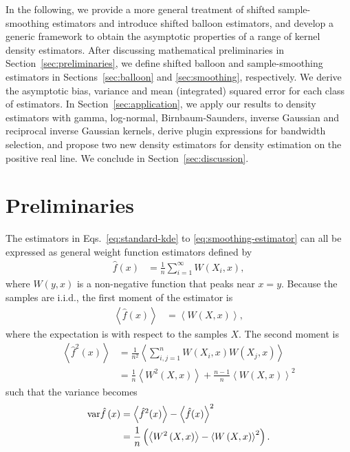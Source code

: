 In the following, we provide a more general treatment of shifted sample-smoothing estimators and introduce shifted balloon estimators, and develop a generic framework to obtain the asymptotic properties of a range of kernel density estimators. After discussing mathematical preliminaries in Section~\ref{sec:preliminaries}, we define shifted balloon and sample-smoothing estimators in Sections~\ref{sec:balloon} and \ref{sec:smoothing}, respectively. We derive the asymptotic bias, variance and mean (integrated) squared error for each class of estimators. In Section~\ref{sec:application}, we apply our results to density estimators with gamma, log-normal, Birnbaum-Saunders, inverse Gaussian and reciprocal inverse Gaussian kernels, derive plugin expressions for bandwidth selection, and propose two new density estimators for density estimation on the positive real line. We conclude in Section~\ref{sec:discussion}.


\section{Preliminaries\label{sec:preliminaries}}

The estimators in Eqs.~\eqref{eq:standard-kde} to \eqref{eq:smoothing-estimator} can all be expressed as general weight function estimators defined by
\begin{align}
\hat{f}\left(x\right) & =\frac{1}{n}\sum_{i=1}^{\infty}W\left(X_{i},x\right),\label{eq:generalised-estimator}
\end{align}
where $W\left(y,x\right)$ is a non-negative function that peaks near $x=y$. Because the samples are i.i.d., the first moment of the estimator is
\begin{align}
\left\langle \hat{f}\left(x\right)\right\rangle  & =\left\langle W\left(X,x\right)\right\rangle ,\label{eq:generalised-mean}
\end{align}
where the expectation is with respect to the samples $X$. The second moment is
\begin{align*}
\left\langle \hat{f}^{2}\left(x\right)\right\rangle  & =\frac{1}{n^{2}}\left\langle \sum_{i,j=1}^{n}W\left(X_{i},x\right)W\left(X_{j},x\right)\right\rangle \\
 & =\frac{1}{n}\left\langle W^{2}\left(X,x\right)\right\rangle +\frac{n-1}{n}\left\langle W\left(X,x\right)\right\rangle ^{2}
\end{align*}
such that the variance becomes
\begin{align}
\mathrm{var}\hat{f}\left(x\right) & =\left\langle \hat{f}^{2}(x)\right\rangle -\left\langle \hat{f}(x)\right\rangle ^{2}\nonumber \\
 & =\frac{1}{n}\left(\left\langle W^{2}\left(X,x\right)\right\rangle -\left\langle W\left(X,x\right)\right\rangle ^{2}\right).\label{eq:generalised-variance}
\end{align}


